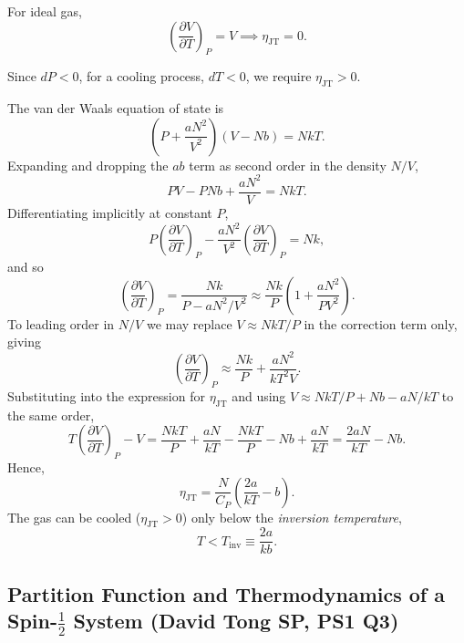 For ideal gas, 
\begin{equation}
    \left(\frac{\partial V}{\partial T}\right)_P = V \implies \eta_{\text{JT}}=0.
\end{equation}

Since $dP<0$, for a cooling process, $dT<0$, we require $\eta_{\text{JT}}>0$.

The van der Waals equation of state is
\begin{equation}
    \left(P + \frac{aN^2}{V^2}\right)(V-Nb) = NkT.
\end{equation}
Expanding and dropping the $ab$ term as second order in the density $N/V$,
\begin{equation}
    PV - PNb + \frac{aN^2}{V} = NkT.
\end{equation}
Differentiating implicitly at constant $P$,
\begin{equation}
    P\left(\frac{\partial V}{\partial T}\right)_P - \frac{aN^2}{V^2}\left(\frac{\partial V}{\partial T}\right)_P = Nk,
\end{equation}
and so
\begin{equation}
    \left(\frac{\partial V}{\partial T}\right)_P = \frac{Nk}{P - aN^2/V^2} \approx \frac{Nk}{P}\left(1 + \frac{aN^2}{PV^2}\right).
\end{equation}
To leading order in $N/V$ we may replace $V \approx NkT/P$ in the correction term only, giving
\begin{equation}
    \left(\frac{\partial V}{\partial T}\right)_P \approx \frac{Nk}{P} + \frac{aN^2}{kT^2 V}.
\end{equation}
Substituting into the expression for $\eta_{\mathrm{JT}}$ and using $V \approx NkT/P + Nb - aN/kT$ to the same order,
\begin{equation}
    T\left(\frac{\partial V}{\partial T}\right)_P - V 
    = \frac{NkT}{P} + \frac{aN}{kT} - \frac{NkT}{P} - Nb + \frac{aN}{kT}
    = \frac{2aN}{kT} - Nb.
\end{equation}
Hence,
\begin{equation}
    \eta_{\mathrm{JT}} = \frac{N}{C_P}\left(\frac{2a}{kT} - b\right).
    \label{eq:JT-vdW}
\end{equation}
The gas can be cooled ($\eta_{\mathrm{JT}}>0$) only below the \textit{inversion temperature},
\begin{equation}
    T < T_{\mathrm{inv}} \equiv \frac{2a}{kb}.
\end{equation}

\subsection{Partition Function and Thermodynamics of a Spin-$\frac{1}{2}$ System (David Tong SP, PS1 Q3)}
\label{sec:spin-half}

